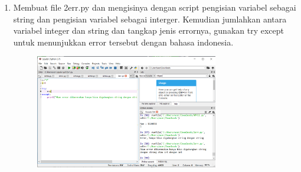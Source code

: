 \begin{enumerate}
\item
Membuat file 2err.py dan mengisinya dengan script pengisian variabel sebagai string dan pengisian variabel sebagai interger. 
Kemudian jumlahkan antara variabel integer dan string dan tangkap jenis errornya, gunakan try except untuk menunjukkan error tersebut dengan
bahasa indonesia.
\begin{figure}[h]
\centerline{\includegraphics[width=8cm]{figures/2err.PNG}}
\end{figure}


\end{enumerate}